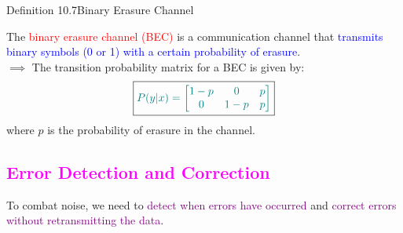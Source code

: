 \documentclass{book}
\begin{document}
\begin{defBox}{Definition 10.7}{Binary Erasure Channel}
    \begin{figure}
    \end{figure}
    The \textcolor{red}{binary erasure channel (BEC)} is a communication channel that \textcolor{blue}{transmits binary symbols (0 or 1) with a certain probability of erasure}.\\
    $\implies$ The transition probability matrix for a BEC is given by:
    \[
        \boxed{\textcolor{teal}{P(y|x) = \begin{bmatrix} 
            1 - p & 0 & p \\
            0 & 1 - p & p \\
        \end{bmatrix}}}
    \]
    where $p$ is the probability of erasure in the channel.
\end{defBox}

\newpage
\textcolor{magenta}{\section{\textbf{Error Detection and Correction}}}
To combat noise, we need to \textcolor{purple}{detect when errors have occurred} and \textcolor{purple}{correct errors without retransmitting the data}.\\
\vspace{5mm}
\end{document}
